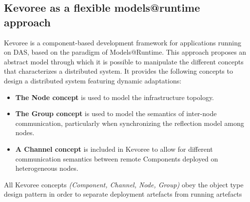 \subsection{Kevoree as a flexible models@runtime approach}
\label{sec:MAR_overview}
Kevoree is a component-based development framework for applications running on DAS, based on the paradigm of Models@Runtime.
This approach proposes an abstract model through which it is possible to manipulate the different concepts that characterizes a distributed system.
It provides the following concepts to design a distributed system featuring dynamic adaptations:
\begin{itemize}
	\item \textbf{The Node concept} is used to model the infrastructure topology.
	\item \textbf{The Group concept} is used to model the semantics of inter-node communication, particularly when synchronizing the reflection model among nodes.
	\item \textbf{A Channel concept} is included in Kevoree to allow for different communication semantics between remote Components deployed on heterogeneous nodes. 
\end{itemize}
All Kevoree concepts \textit{(Component, Channel, Node, Group)} obey the object type design pattern \cite{woolf1996type} in order to separate deployment artefacts from running artefacts

